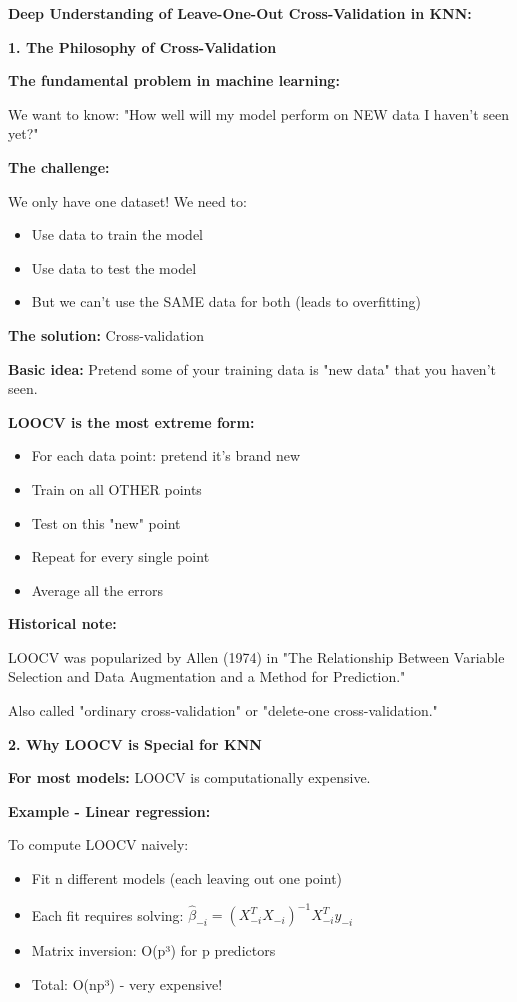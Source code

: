 \documentclass[12pt]{article}
\begin{document}
\begin{explanation}
\textbf{Deep Understanding of Leave-One-Out Cross-Validation in KNN:}

\textbf{1. The Philosophy of Cross-Validation}

\textbf{The fundamental problem in machine learning:}

We want to know: "How well will my model perform on NEW data I haven't seen yet?"

\textbf{The challenge:}

We only have one dataset! We need to:
\begin{itemize}
    \item Use data to train the model
    \item Use data to test the model
    \item But we can't use the SAME data for both (leads to overfitting)
\end{itemize}

\textbf{The solution:} Cross-validation

\textbf{Basic idea:} Pretend some of your training data is "new data" that you haven't seen.

\textbf{LOOCV is the most extreme form:}
\begin{itemize}
    \item For each data point: pretend it's brand new
    \item Train on all OTHER points
    \item Test on this "new" point
    \item Repeat for every single point
    \item Average all the errors
\end{itemize}

\textbf{Historical note:}

LOOCV was popularized by Allen (1974) in "The Relationship Between Variable Selection and Data Augmentation and a Method for Prediction."

Also called "ordinary cross-validation" or "delete-one cross-validation."

\textbf{2. Why LOOCV is Special for KNN}

\textbf{For most models:} LOOCV is computationally expensive.

\textbf{Example - Linear regression:}

To compute LOOCV naively:
\begin{itemize}
    \item Fit n different models (each leaving out one point)
    \item Each fit requires solving: $\hat{\beta}_{-i} = (X_{-i}^T X_{-i})^{-1}X_{-i}^T y_{-i}$
    \item Matrix inversion: O(p³) for p predictors
    \item Total: O(np³) - very expensive!
\end{itemize}


\end{explanation}
\end{document}
